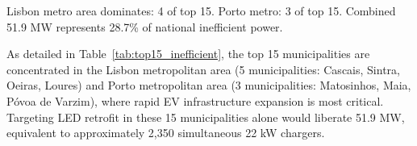 \documentclass[conference]{IEEEtran}
\begin{document}
\begin{table}[htbp]
\centering
\caption{Top 15 Municipalities by Inefficient Power (Sodium/Mercury Lamps)}
\small
{}
\vspace{1mm}
\footnotesize{Lisbon metro area dominates: 4 of top 15. Porto metro: 3 of top 15. Combined 51.9 MW represents 28.7\% of national inefficient power.}
\label{tab:top15_inefficient}
\end{table}

As detailed in Table~\ref{tab:top15_inefficient}, the top 15 municipalities are concentrated in the Lisbon metropolitan area (5 municipalities: Cascais, Sintra, Oeiras, Loures) and Porto metropolitan area (3 municipalities: Matosinhos, Maia, Póvoa de Varzim), where rapid EV infrastructure expansion is most critical. Targeting LED retrofit in these 15 municipalities alone would liberate 51.9 MW, equivalent to approximately 2,350 simultaneous 22 kW chargers.
\end{document}

